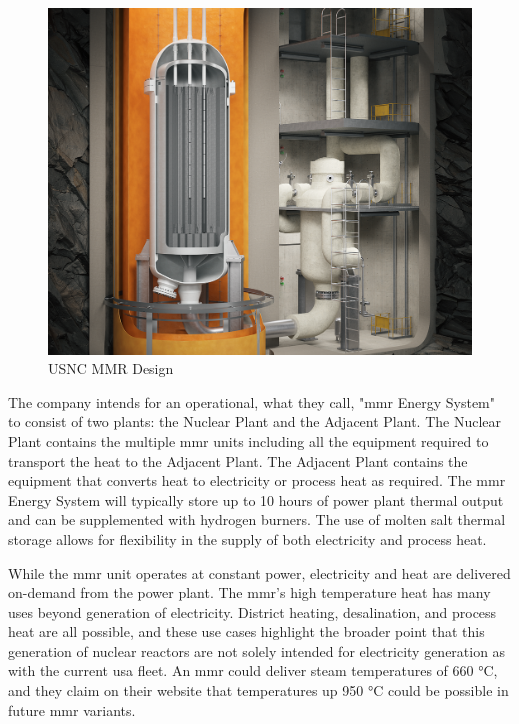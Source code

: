\begin{figure}[H]
    \centering
    \includegraphics[scale=0.19]{images/reactor_design/wide-02.png}
    \caption{USNC MMR Design \cite{usnc_design_2021}}
    \label{fig:mmr_design}
\end{figure}

The company intends for an operational, what they call, "\gls{mmr} Energy System" to consist of two plants: the Nuclear Plant and the Adjacent Plant. The Nuclear Plant contains the multiple \gls{mmr} units including all the equipment required to transport the heat to the Adjacent Plant. The Adjacent Plant contains the equipment that converts heat to electricity or process heat as required. The \gls{mmr} Energy System will typically store up to 10 hours of power plant thermal output and can be supplemented with hydrogen burners. The use of molten salt thermal storage allows for flexibility in the supply of both electricity and process heat.

While the \gls{mmr} unit operates at constant power, electricity and heat are delivered on-demand from the power plant. The \gls{mmr}'s high temperature heat has many uses beyond generation of electricity. District heating, desalination, and process heat are all possible, and these use cases highlight the broader point that this generation of nuclear reactors are not solely intended for electricity generation as with the current \gls{usa} fleet. An \gls{mmr} could deliver steam temperatures of 660 °C, and they claim on their website that temperatures up 950 °C could be possible in future \gls{mmr} variants.

